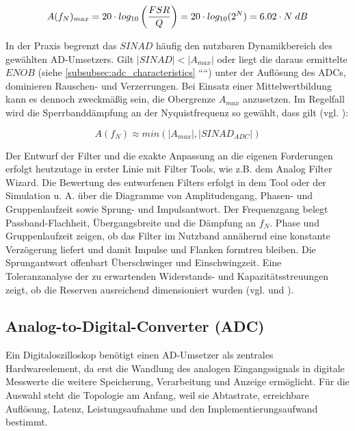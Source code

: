 \documentclass[a4paper, portrait, 12pt]{scrartcl} %
\begin{document}
\begin{equation}
	A(f_N)_{max}=20\cdot log_{10}\left( \frac{FSR}{Q}\right) =20\cdot log_{10}(2^N)=6.02\cdot N\hspace{0.1cm}dB
\end{equation}

In der Praxis begrenzt das $SINAD$ häufig den nutzbaren Dynamikbereich des gewählten AD-Umsetzers. Gilt $|SINAD|<|A_{max}|$ oder liegt die daraus ermittelte $ENOB$ (siehe \autoref{subsubsec:adc_characteristics} ````) unter der Auflösung des ADCs, dominieren Rauschen- und Verzerrungen. Bei Einsatz einer Mittelwertbildung kann es dennoch zweckmäßig sein, die Obergrenze $A_{max}$ anzusetzen. Im Regelfall wird die Sperrbanddämpfung an der Nyquistfrequenz so gewählt, dass gilt (vgl. \cite{Pini2020}):

\begin{equation}
	A(f_N)\approx min(|A_{max}|, |SINAD_{ADC}|)
\end{equation}

Der Entwurf der Filter und die exakte Anpassung an die eigenen Forderungen erfolgt heutzutage in erster Linie mit Filter Tools, wie z.B. dem Analog Filter Wizard. Die Bewertung des entworfenen Filters erfolgt in dem Tool oder der Simulation u. A. über die Diagramme von Amplitudengang, Phasen- und Gruppenlaufzeit sowie Sprung- und Impulsantwort. Der Frequenzgang belegt Passband-Flachheit, Übergangsbreite und die Dämpfung an $f_N$. Phase und Gruppenlaufzeit zeigen, ob das Filter im Nutzband annähernd eine konstante Verzögerung liefert und damit Impulse und Flanken formtreu bleiben. Die Sprungantwort offenbart Überschwinger und Einschwingzeit. Eine Toleranzanalyse der zu erwartenden Widerstands- und Kapazitätsstreuungen zeigt, ob die Reserven ausreichend dimensioniert wurden (vgl. \cite{Pini2020} und \cite{Padmanabhuni2017}).

\subsection{Analog-to-Digital-Converter (ADC)}
\label{subsec:adc}

Ein Digitaloszilloskop benötigt einen AD-Umsetzer als zentrales Hardwareelement, da erst die Wandlung des analogen Eingangssignals in digitale Messwerte die weitere Speicherung, Verarbeitung und Anzeige ermöglicht. Für die Auswahl steht die Topologie am Anfang, weil sie Abtastrate, erreichbare Auflösung, Latenz, Leistungsaufnahme und den Implementierungsaufwand bestimmt.\\
\end{document}
